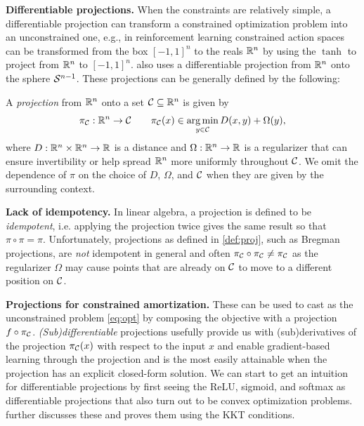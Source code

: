 \documentclass[twoside,11pt]{article}
\newcommand{\eg}{e.g.\xspace}
\newcommand{\ie}{i.e.\xspace}
\begin{document}
\textbf{Differentiable projections.}
When the constraints are relatively simple, a differentiable projection
can transform a constrained optimization problem into an unconstrained one,
\eg, in reinforcement learning constrained action spaces can be transformed
from the box $[-1,1]^n$ to the reals $\mathbb{R}^n$ by using
the $\tanh$ to project from $\mathbb{R}^n$ to $[-1,1]^n$.
 also uses a differentiable projection from $\mathbb{R}^n$
onto the sphere ${\mathcal{S}}^{n-1}$.
These projections can be generally defined by the following:

\begin{definition}
  A \emph{projection} from $\mathbb{R}^n$ onto a set ${\mathcal{C}}\subseteq \mathbb{R}^n$ is given by
  \begin{equation}
    \pi_{\mathcal{C}}: \mathbb{R}^n\rightarrow {\mathcal{C}} \qquad \pi_{\mathcal{C}}(x) \in \operatorname*{arg\,min}_{y\in{\mathcal{C}}} D(x, y) + \Omega(y),
    \label{eq:proj}
  \end{equation}
  where $D: \mathbb{R}^n\times\mathbb{R}^n\rightarrow \mathbb{R}$ is a distance and $\Omega:\mathbb{R}^n\rightarrow \mathbb{R}$ is
  a regularizer that can ensure invertibility or help spread $\mathbb{R}^n$ more uniformly throughout ${\mathcal{C}}$.
  We omit the dependence of $\pi$ on the choice of $D$, $\Omega$, and ${\mathcal{C}}$
  when they are given by the surrounding context.
  \label{def:proj}
\end{definition}

\textbf{Lack of idempotency.} In linear algebra, a projection is defined to
be \emph{idempotent}, \ie applying the projection twice gives the same result
so that $\pi\circ \pi=\pi$.
Unfortunately, projections as defined in \cref{def:proj},
such as Bregman projections, are \emph{not} idempotent in general
and often $\pi_{\mathcal{C}}\circ \pi_{\mathcal{C}}\neq \pi_{\mathcal{C}}$
as the regularizer $\Omega$ may cause points that are already on ${\mathcal{C}}$
to move to a different position on ${\mathcal{C}}$.

\textbf{Projections for constrained amortization.}
These can be used to cast  as the unconstrained
problem \cref{eq:opt} by composing the objective with a projection
$f\circ \pi_{\mathcal{C}}$.
\emph{(Sub)differentiable} projections usefully provide us with (sub)derivatives
of the projection $\pi_{\mathcal{C}}(x)$ with respect to the input $x$ and enable
gradient-based learning through the projection and is the most easily attainable
when the projection has an explicit closed-form solution.
We can start to get an intuition for differentiable projections by first
seeing the ReLU, sigmoid, and softmax as differentiable projections
that also turn out to be convex optimization problems.
\citet[2.4.4]{amos2019differentiable} further discusses these
and proves them using the KKT conditions.
\end{document}
